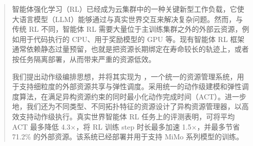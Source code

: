 \begin{abstract}
智能体强化学习（RL）已经成为云集群中的一种关键新型工作负载，它使大语言模型（LLM）能够通过与真实世界交互来解决复杂问题。然而，与传统 RL 不同，智能体 RL 需要大量位于主训练集群之外的外部云资源，例如用于代码执行的 CPU、用于奖励模型的 GPU 等。现有智能体 RL 框架通常依赖静态过量预留，也就是把资源长期绑定在寿命较长的轨迹上，或者按任务隔离部署，从而带来严重的资源低效。

我们提出动作级编排思想，并将其实现为 \sysname，一个统一的资源管理系统，用于支持细粒度的外部资源共享与弹性调度。\sysname 采用统一的动作级建模和弹性调度算法，在满足异构资源约束的同时最小化动作完成时间（ACT）。进一步地，我们还为不同类型、不同拓扑特征的资源设计了异构资源管理器，以高效支持动作级执行。真实世界智能体 RL 任务上的评测表明，\sysname 可将平均 ACT 最多降低 4.3$\times$，将 RL 训练 step 时长最多加速 1.5$\times$，并最多节省 71.2$\%$ 的外部资源。该系统已经部署并用于支持 MiMo 系列模型的训练。
\end{abstract}
